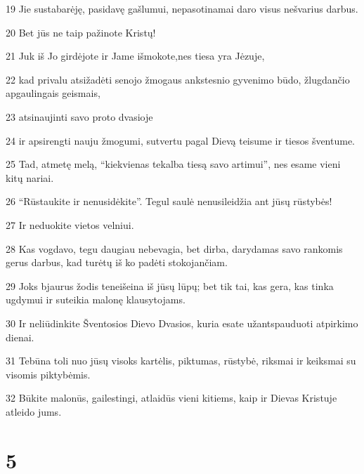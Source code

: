 \par 19 Jie sustabarėję, pasidavę gašlumui, nepasotinamai daro visus nešvarius darbus. 
\par 20 Bet jūs ne taip pažinote Kristų! 
\par 21 Juk iš Jo girdėjote ir Jame išmokote,­nes tiesa yra Jėzuje,­ 
\par 22 kad privalu atsižadėti senojo žmogaus ankstesnio gyvenimo būdo, žlugdančio apgaulingais geismais, 
\par 23 atsinaujinti savo proto dvasioje 
\par 24 ir apsirengti nauju žmogumi, sutvertu pagal Dievą teisume ir tiesos šventume. 
\par 25 Tad, atmetę melą, “kiekvienas tekalba tiesą savo artimui”, nes esame vieni kitų nariai. 
\par 26 “Rūstaukite ir nenusidėkite”. Tegul saulė nenusileidžia ant jūsų rūstybės! 
\par 27 Ir neduokite vietos velniui. 
\par 28 Kas vogdavo, tegu daugiau nebevagia, bet dirba, darydamas savo rankomis gerus darbus, kad turėtų iš ko padėti stokojančiam. 
\par 29 Joks bjaurus žodis teneišeina iš jūsų lūpų; bet tik tai, kas gera, kas tinka ugdymui ir suteikia malonę klausytojams. 
\par 30 Ir neliūdinkite Šventosios Dievo Dvasios, kuria esate užantspauduoti atpirkimo dienai. 
\par 31 Tebūna toli nuo jūsų visoks kartėlis, piktumas, rūstybė, riksmai ir keiksmai su visomis piktybėmis. 
\par 32 Būkite malonūs, gailestingi, atlaidūs vieni kitiems, kaip ir Dievas Kristuje atleido jums.


\chapter{5}


